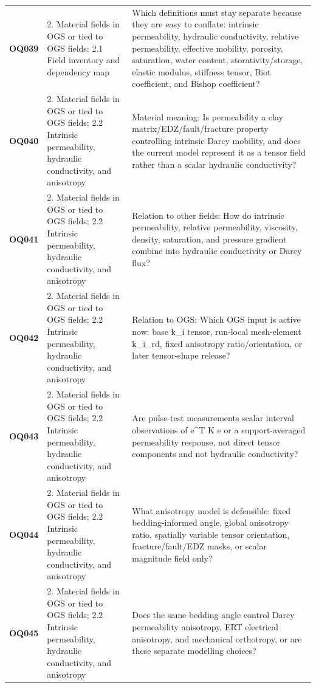 \begin{longtable}{@{}L{0.10\textwidth} L{0.23\textwidth} L{0.59\textwidth}@{}}
\addlinespace[0.16em]
\textbf{OQ039} & 2. Material fields in OGS or tied to OGS fields; 2.1 Field inventory and dependency map & Which definitions must stay separate because they are easy to conflate: intrinsic permeability, hydraulic conductivity, relative permeability, effective mobility, porosity, saturation, water content, storativity/storage, elastic modulus, stiffness tensor, Biot coefficient, and Bishop coefficient?\\
\addlinespace[0.16em]
\textbf{OQ040} & 2. Material fields in OGS or tied to OGS fields; 2.2 Intrinsic permeability, hydraulic conductivity, and anisotropy & Material meaning: Is permeability a clay matrix/EDZ/fault/fracture property controlling intrinsic Darcy mobility, and does the current model represent it as a tensor field rather than a scalar hydraulic conductivity?\\
\addlinespace[0.16em]
\textbf{OQ041} & 2. Material fields in OGS or tied to OGS fields; 2.2 Intrinsic permeability, hydraulic conductivity, and anisotropy & Relation to other fields: How do intrinsic permeability, relative permeability, viscosity, density, saturation, and pressure gradient combine into hydraulic conductivity or Darcy flux?\\
\addlinespace[0.16em]
\textbf{OQ042} & 2. Material fields in OGS or tied to OGS fields; 2.2 Intrinsic permeability, hydraulic conductivity, and anisotropy & Relation to OGS: Which OGS input is active now: base k\_i tensor, run-local mesh-element k\_i\_rd, fixed anisotropy ratio/orientation, or later tensor-shape release?\\
\addlinespace[0.16em]
\textbf{OQ043} & 2. Material fields in OGS or tied to OGS fields; 2.2 Intrinsic permeability, hydraulic conductivity, and anisotropy & Are pulse-test measurements scalar interval observations of e\textasciicircum{}T K e or a support-averaged permeability response, not direct tensor components and not hydraulic conductivity?\\
\addlinespace[0.16em]
\textbf{OQ044} & 2. Material fields in OGS or tied to OGS fields; 2.2 Intrinsic permeability, hydraulic conductivity, and anisotropy & What anisotropy model is defensible: fixed bedding-informed angle, global anisotropy ratio, spatially variable tensor orientation, fracture/fault/EDZ masks, or scalar magnitude field only?\\
\addlinespace[0.16em]
\textbf{OQ045} & 2. Material fields in OGS or tied to OGS fields; 2.2 Intrinsic permeability, hydraulic conductivity, and anisotropy & Does the same bedding angle control Darcy permeability anisotropy, ERT electrical anisotropy, and mechanical orthotropy, or are these separate modelling choices?\\

\end{longtable}

